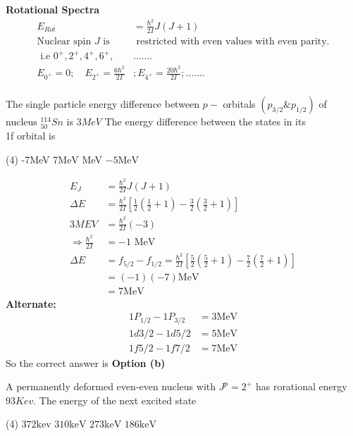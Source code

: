 \textbf{Rotational Spectra}
\begin{align*}
E_{R o t}&=\frac{\hbar^{2}}{2 I} J(J+1)\\
\text{Nuclear spin $J$ is}&\text{ restricted with even values with even parity.}\\
\text { i.e } 0^{+}, 2^{+} , 4 ^{+}, 6 ^{+},& \ldots . \ldots\\
E_{0^{+}}=0 ; \quad E_{2^{+}}=\frac{6 \hbar^{2}}{2 I} &; E_{4^{+}}=\frac{20 \hbar^{2}}{2 I} ; \ldots . \ldots\\
\end{align*}
\begin{exercise}
	The single particle energy difference between $p-$ orbitals $\left(p_{3 / 2} \& p_{1 / 2}\right)$ of nucleus ${}^{114}_{50}Sn$ is $3MeV$ The energy difference between the states in its \\
	1f orbital is 
	\begin{tasks}(4)
		\task[\textbf{a.}]-7MeV
		\task[\textbf{b.}]$7 \mathrm{MeV}$
		 MeV
		\task[\textbf{d.}] $-5 \mathrm{MeV}$
	\end{tasks}
\end{exercise}
\begin{answer}
	\begin{align*}
	E_{J}&=\frac{\hbar^{2}}{2 I} J(J+1)\\
	\Delta E&=\frac{\hbar^{2}}{2 I}\left[\frac{1}{2}\left(\frac{1}{2}+1\right)-\frac{3}{2}\left(\frac{3}{2}+1\right)\right]\\
	3 M E V&=\frac{\hbar^{2}}{2 I}(-3)\\
	\Rightarrow \frac{\hbar^{2}}{2 I}&=-1 \text { MeV }\\
	\Delta E&=f_{5 / 2}-f_{1 / 2}=\frac{\hbar^{2}}{2 I}\left[\frac{5}{2}\left(\frac{5}{2}+1\right)-\frac{7}{2}\left(\frac{7}{2}+1\right)\right]\\
	&=(-1)(-7) \mathrm{MeV}\\
	&=7 \mathrm{MeV}
	\end{align*}
	\textbf{	Alternate:}
	\begin{align*}
	1 P_{1 / 2}-1 P_{3 / 2}&=3 \mathrm{MeV}\\
	1d{ 3 / 2}-1 d{5/2}&=5 \mathrm{MeV}\\
	1f{ 5 / 2}-1 f{7/2}&=7 \mathrm{MeV}
	\end{align*}
	So the correct answer is \textbf{Option (b)}
\end{answer}
\begin{exercise}
	A permanently deformed even-even nucleus with $J^p=2^+$ has rorational energy $93 Kev$. The energy of the next excited state
	\begin{tasks}(4)
		\task[\textbf{a.}]$372 \mathrm{kev}$
		\task[\textbf{b.}] $310 \mathrm{keV}$
		\task[\textbf{c.}]$273 \mathrm{keV}$
		\task[\textbf{d.}]$186 \mathrm{keV}$ 
	\end{tasks}
\end{exercise}
